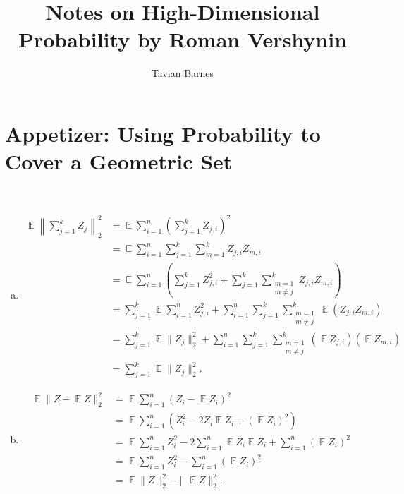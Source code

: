 \documentclass{report}
\title{Notes on High-Dimensional Probability \linebreak[1] by Roman Vershynin}
\author{Tavian Barnes}
\date{}
\theoremstyle{definition}
\newenvironment{exercise}[1]{
  \renewcommand\theexerciseimpl{#1}
  \exerciseimpl
}{\endexerciseimpl}
\DeclareMathOperator{\E}{\mathbb{E}}
\begin{document}
\maketitle

\chapter*{Appetizer: Using Probability to Cover a Geometric Set}

\begin{exercise}{0.0.3}~
  \begin{enumerate}[(a)]
  \item
    \begin{align*}
      \E \left\| \sum_{j=1}^k Z_j \right\|_2^2 & = \E \sum_{i=1}^n \left(\sum_{j=1}^k Z_{j,i}\right)^2 \\
      & = \E \sum_{i=1}^n \sum_{j=1}^k \sum_{m=1}^k Z_{j,i} Z_{m,i} \\
      & = \E \sum_{i=1}^n \left(\sum_{j=1}^k Z_{j,i}^2 + \sum_{j=1}^k \sum_{\substack{m=1 \\ m \ne j}}^k Z_{j,i} Z_{m,i}\right) \\
      & = \sum_{j=1}^k \E \sum_{i=1}^n Z_{j,i}^2 + \sum_{i=1}^n \sum_{j=1}^k \sum_{\substack{m=1 \\ m \ne j}}^k \E (Z_{j,i} Z_{m,i}) \\
      & = \sum_{j=1}^k \E \|Z_j\|_2^2 + \sum_{i=1}^n \sum_{j=1}^k \sum_{\substack{m=1 \\ m \ne j}}^k (\E Z_{j,i}) (\E Z_{m,i}) \tag{by independence} \\
      & = \sum_{j=1}^k \E \|Z_j\|_2^2.
    \end{align*}

  \item
    \begin{align*}
      \E \|Z - \E{Z}\|_2^2 & = \E \sum_{i=1}^n (Z_i - \E{Z_i})^2 \\
      & = \E \sum_{i=1}^n (Z_i^2 - 2 Z_i \E{Z_i} + (\E{Z_i})^2) \\
      & = \E \sum_{i=1}^n Z_i^2 - 2 \sum_{i=1}^n \E Z_i \E{Z_i} + \sum_{i=1}^n (\E Z_i)^2 \\
      & = \E \sum_{i=1}^n Z_i^2 -  \sum_{i=1}^n (\E Z_i)^2 \\
      & = \E \|Z\|_2^2 - \|\E Z\|_2^2.
    \end{align*}
  \end{enumerate}
\end{exercise}
\end{document}
